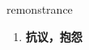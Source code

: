 
\begin{frame}
{\huge remonstrance}
\begin{center}
\begin{enumerate}\Large
  \item \textbf{抗议，抱怨}
\end{enumerate}
\end{center}
\end{frame}
